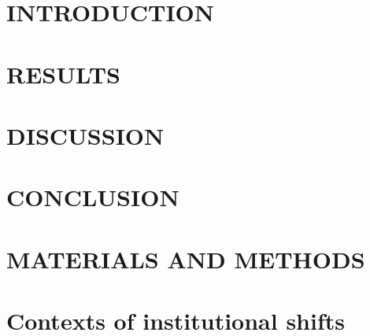 \documentclass[preprint, 12pt]{elsarticle}
\begin{document}
\maketitle

\section{INTRODUCTION}\label{sec:introduction}


\section{RESULTS}\label{sec:results}



\section{DISCUSSION}\label{sec:discussion}


\section{CONCLUSION}\label{sec:conclusion}


\section{MATERIALS AND METHODS}\label{sec:methods}





\label{bib}

\newpage
\appendix\label{appendix}

\section{Contexts of institutional shifts}\label{secS1}
\renewcommand{\thefigure}{A\arabic{figure}}
\renewcommand{\thetable}{A\arabic{table}}
\setcounter{figure}{0}
\setcounter{table}{0}

\end{document}

